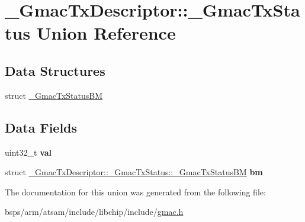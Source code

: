 \hypertarget{union__GmacTxDescriptor_1_1__GmacTxStatus}{}\section{\+\_\+\+Gmac\+Tx\+Descriptor\+::\+\_\+\+Gmac\+Tx\+Status Union Reference}
\label{union__GmacTxDescriptor_1_1__GmacTxStatus}
\subsection*{Data Structures}
\begin{DoxyCompactItemize}
\item 
struct \mbox{\hyperlink{struct__GmacTxDescriptor_1_1__GmacTxStatus_1_1__GmacTxStatusBM}{\+\_\+\+Gmac\+Tx\+Status\+BM}}
\end{DoxyCompactItemize}
\subsection*{Data Fields}
\begin{DoxyCompactItemize}
\item 
uint32\+\_\+t {\bfseries val}
\item 
struct \mbox{\hyperlink{struct__GmacTxDescriptor_1_1__GmacTxStatus_1_1__GmacTxStatusBM}{\+\_\+\+Gmac\+Tx\+Descriptor\+::\+\_\+\+Gmac\+Tx\+Status\+::\+\_\+\+Gmac\+Tx\+Status\+BM}} {\bfseries bm}
\end{DoxyCompactItemize}


The documentation for this union was generated from the following file\+:\begin{DoxyCompactItemize}
\item 
bsps/arm/atsam/include/libchip/include/\mbox{\hyperlink{gmac_8h}{gmac.\+h}}\end{DoxyCompactItemize}
